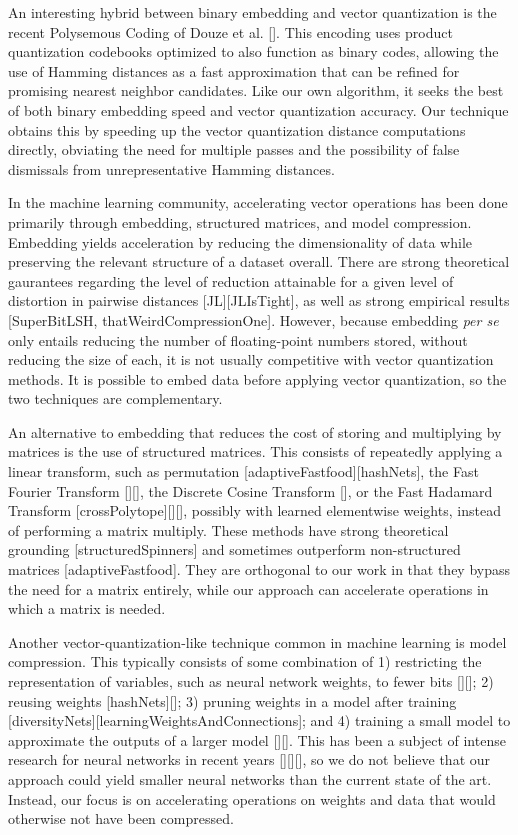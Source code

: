 An interesting hybrid between binary embedding and vector quantization is the recent Polysemous Coding of Douze et al. []. This encoding uses product quantization codebooks optimized to also function as binary codes, allowing the use of Hamming distances as a fast approximation that can be refined for promising nearest neighbor candidates. Like our own algorithm, it seeks the best of both binary embedding speed and vector quantization accuracy. Our technique obtains this by speeding up the vector quantization distance computations directly, obviating the need for multiple passes and the possibility of false dismissals from unrepresentative Hamming distances.

In the machine learning community, accelerating vector operations has been done primarily through embedding, structured matrices, and model compression. Embedding yields acceleration by reducing the dimensionality of data while preserving the relevant structure of a dataset overall. There are strong theoretical gaurantees regarding the level of reduction attainable for a given level of distortion in pairwise distances [JL][JLIsTight], as well as strong empirical results [SuperBitLSH, thatWeirdCompressionOne]. However, because embedding \textit{per se} only entails reducing the number of floating-point numbers stored, without reducing the size of each, it is not usually competitive with vector quantization methods. It is possible to embed data before applying vector quantization, so the two techniques are complementary.

An alternative to embedding that reduces the cost of storing and multiplying by matrices is the use of structured matrices. This consists of repeatedly applying a linear transform, such as permutation [adaptiveFastfood][hashNets], the Fast Fourier Transform [][], the Discrete Cosine Transform [], or the Fast Hadamard Transform [crossPolytope][][], possibly with learned elementwise weights, instead of performing a matrix multiply. These methods have strong theoretical grounding [structuredSpinners] and sometimes outperform non-structured matrices [adaptiveFastfood]. They are orthogonal to our work in that they bypass the need for a matrix entirely, while our approach can accelerate operations in which a matrix is needed.

Another vector-quantization-like technique common in machine learning is model compression. This typically consists of some combination of 1) restricting the representation of variables, such as neural network weights, to fewer bits [][]; 2) reusing weights [hashNets][]; 3) pruning weights in a model after training [diversityNets][learningWeightsAndConnections]; and 4) training a small model to approximate the outputs of a larger model [][]. This has been a subject of intense research for neural networks in recent years [][][], so we do not believe that our approach could yield smaller neural networks than the current state of the art. Instead, our focus is on accelerating operations on weights and data that would otherwise not have been compressed.%

